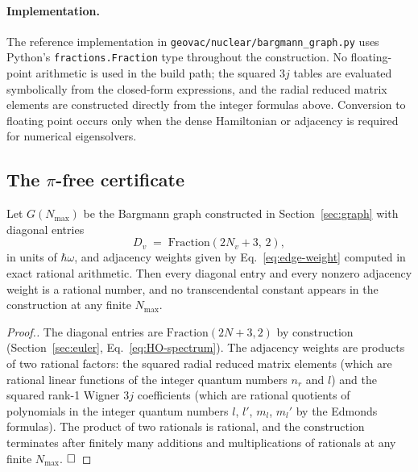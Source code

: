 \documentclass[twocolumn,pra,amsmath,amssymb,superscriptaddress]{revtex4-2}
\begin{document}
\paragraph{Implementation.}
The reference implementation in
\texttt{geovac/nuclear/bargmann\_graph.py} uses Python's
\texttt{fractions.Fraction} type throughout the construction.  No
floating-point arithmetic is used in the build path; the squared
$3j$ tables are evaluated symbolically from the closed-form
expressions, and the radial reduced matrix elements are constructed
directly from the integer formulas above.  Conversion to floating
point occurs only when the dense Hamiltonian or adjacency is
required for numerical eigensolvers.

\subsection{The $\pi$-free certificate}
\label{sec:pi-free}

\begin{theorem}
\label{thm:pi-free}
Let $G(N_{\max})$ be the Bargmann graph constructed in
Section~\ref{sec:graph} with diagonal entries
\begin{equation}
  D_v
  \;=\;
  \mathrm{Fraction}\!\left( 2 N_v + 3,\, 2 \right),
\end{equation}
in units of $\hbar\omega$, and adjacency weights given by
Eq.~\eqref{eq:edge-weight} computed in exact rational arithmetic.
Then every diagonal entry and every nonzero adjacency weight is a
rational number, and no transcendental constant appears in the
construction at any finite $N_{\max}$.
\end{theorem}

\begin{proof}[Proof.]
The diagonal entries are $\mathrm{Fraction}(2 N + 3, 2)$ by
construction (Section~\ref{sec:euler}, Eq.~\eqref{eq:HO-spectrum}).
The adjacency weights are products of two rational factors:
the squared radial reduced matrix elements (which are rational
linear functions of the integer quantum numbers $n_r$ and $l$) and
the squared rank-1 Wigner $3j$ coefficients (which are rational
quotients of polynomials in the integer quantum numbers $l$, $l'$,
$m_l$, $m_l'$ by the Edmonds~\cite{edmonds} formulas).  The product
of two rationals is rational, and the construction terminates after
finitely many additions and multiplications of rationals at any
finite $N_{\max}$.  $\hfill\square$
\end{proof}
\end{document}
